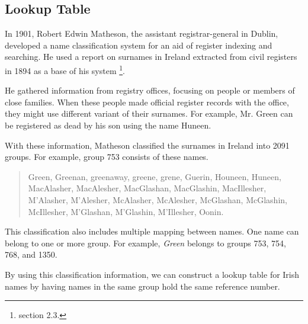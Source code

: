 \subsection{Lookup Table}



In 1901, Robert Edwin Matheson, the assistant registrar-general in Dublin,
developed a name classification system \cite{MathesonV} for an aid of register indexing
and searching. He used a report on surnames in Ireland extracted from
civil registers \cite{MathesonSR} in 1894 as a base of his system
\footnote{\cite{adamw} section 2.3.}.


He gathered information from registry offices, focusing on
people or members of close families. When these people made official
register records with the office, they might use different variant
of their surnames. For example, Mr. Green can be registered as dead
by his son using the name Huneen.

With these information, Matheson classified the surnames in Ireland
into 2091 groups. For example, group 753 consists of these names.

\begin{quotation} \noindent
Green, Greenan, greenaway, greene, grene, Guerin, Houneen, Huneen,
MacAlasher, MacAlesher, MacGlashan, MacGlashin, MacIllesher, M'Alasher,
M'Alesher, McAlasher, McAlesher, McGlashan, McGlashin, McIllesher,
M'Glashan, M'Glashin, M'Illesher, Oonin.
\end{quotation}

This classification also includes multiple mapping between names.
One name can belong to one or more group. For example, \emph{Green}
belongs to groups 753, 754, 768, and 1350.

By using this classification information, we can construct a lookup table
for Irish names by having names in the same group hold the same
reference number.

